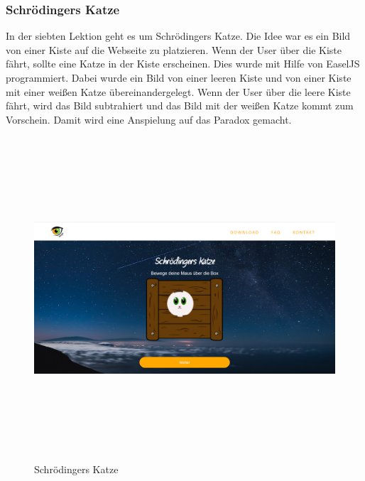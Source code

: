 \subsubsection{Schrödingers Katze}
In der siebten Lektion geht es um Schrödingers Katze. Die Idee war es ein Bild von einer Kiste auf die Webseite zu platzieren. Wenn der User über die Kiste fährt, sollte eine Katze in der Kiste erscheinen. Dies wurde mit Hilfe von EaselJS programmiert. Dabei wurde ein Bild von einer leeren Kiste und von einer Kiste mit einer weißen Katze übereinandergelegt. Wenn der User über die leere Kiste fährt, wird das Bild subtrahiert und das Bild mit der weißen Katze kommt zum Vorschein. Damit wird eine Anspielung auf das Paradox gemacht. 
\begin{figure}[h]
	\centering
\includegraphics[width=12cm,height=12cm,keepaspectratio]{webseite_katze} 
	\caption{Schrödingers Katze}
\end{figure}
